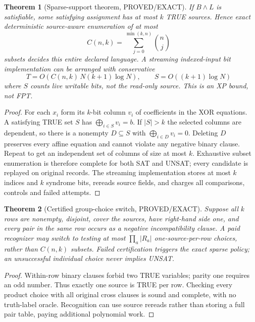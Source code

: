 \documentclass[11pt]{article}
\newtheorem{theorem}{Theorem}
\begin{document}
\begin{theorem}[Sparse-support theorem, PROVED/EXACT]
If $B\land L$ is satisfiable, some satisfying assignment has at most $k$ TRUE sources. Hence exact deterministic source-aware enumeration of at most
\[
C(n,k)=\sum_{j=0}^{\min(k,n)}\binom nj
\]
subsets decides this entire declared language. A streaming indexed-input bit implementation can be arranged with conservative
\[
T=O(C(n,k)\,N(k+1)\log N),\qquad
S=O((k+1)\log N)
\]
where $S$ counts live writable bits, not the read-only source. This is an XP bound, not FPT.
\end{theorem}
\begin{proof}
For each $x_i$ form its $k$-bit column $v_i$ of coefficients in the XOR equations. A satisfying TRUE set $S$ has $\bigoplus_{i\in S}v_i=b$. If $|S|>k$ the selected columns are dependent, so there is a nonempty $D\subseteq S$ with $\bigoplus_{i\in D}v_i=0$. Deleting $D$ preserves every affine equation and cannot violate any negative binary clause. Repeat to get an independent set of columns of size at most $k$. Exhaustive subset enumeration is therefore complete for both SAT and UNSAT; every candidate is replayed on original records. The streaming implementation stores at most $k$ indices and $k$ syndrome bits, rereads source fields, and charges all comparisons, controls and failed attempts.
\end{proof}

\begin{theorem}[Certified group-choice switch, PROVED/EXACT]
Suppose all $k$ rows are nonempty, disjoint, cover the sources, have right-hand side one, and every pair in the same row occurs as a negative incompatibility clause. A paid recognizer may switch to testing at most $\prod_a|R_a|$ one-source-per-row choices, rather than $C(n,k)$ subsets. Failed certification triggers the exact sparse policy; an unsuccessful individual choice never implies UNSAT.
\end{theorem}
\begin{proof}
Within-row binary clauses forbid two TRUE variables; parity one requires an odd number. Thus exactly one source is TRUE per row. Checking every product choice with all original cross clauses is sound and complete, with no truth-label oracle. Recognition can use source rereads rather than storing a full pair table, paying additional polynomial work.
\end{proof}
\end{document}
